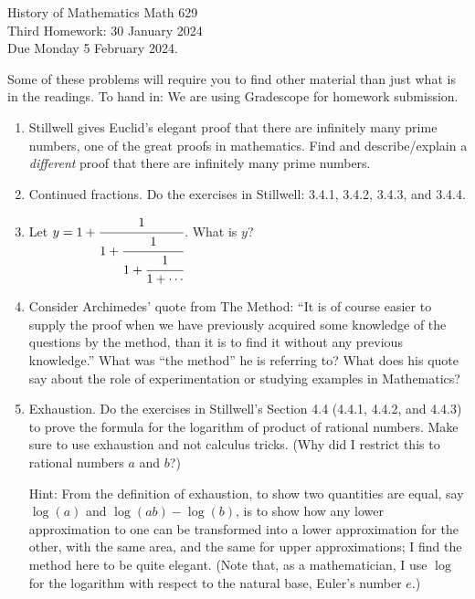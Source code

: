 \documentclass[12pt]{article}
\begin{document}
\LARGE 
\noindent
{\color{Maroon}History of Mathematics \hfill Math 629}\vspace{2pt}\\
\large
Third Homework: \hfill 30 January 2024\\
Due Monday 5 February 2024.
\normalsize\vspace{10pt}

      Some of these problems will require you to find other material than just what is in the readings.
To hand in: We are using Gradescope for homework submission.


\begin{enumerate}

\item Stillwell gives Euclid's elegant proof that there are infinitely many prime numbers, one of the great proofs in mathematics.
  Find and describe/explain a {\it different} proof that there are infinitely many prime numbers.

\item   Continued fractions.  Do the exercises in Stillwell: 3.4.1, 3.4.2, 3.4.3, and 3.4.4.


\item Let $y = 1+\cfrac{1}{1+\cfrac{1}{1+\cfrac{1}{1+\dotsb}}}$.
      What is $y$?

  
\item    Consider Archimedes' quote from The Method: ``It is of course easier to supply the proof when we have previously acquired some
  knowledge of the questions by the method, than it is to find it without any previous knowledge.''
  What was ``the method'' he is referring to?
  What does his quote say about the role of experimentation or studying examples in Mathematics?



\item    Exhaustion.
  Do the exercises in Stillwell's Section 4.4 (4.4.1, 4.4.2, and 4.4.3) to prove the formula for the logarithm of product of rational
  numbers. Make sure to use exhaustion and not calculus tricks.
  (Why did I restrict this to rational numbers $a$ and $b$?)
  
  Hint: From the definition of exhaustion, to show two quantities are equal, say $\log(a)$ and $\log(ab)-\log(b)$,
  is to show how any lower approximation to one can be transformed into a lower approximation for the other, with the same area, and the
  same for upper approximations; I find the method here to be quite elegant.
  (Note that, as a mathematician, I use $\log$ for the logarithm with respect to the natural base, Euler's
  number $e$.)  
       
\end{enumerate}
\end{document}
